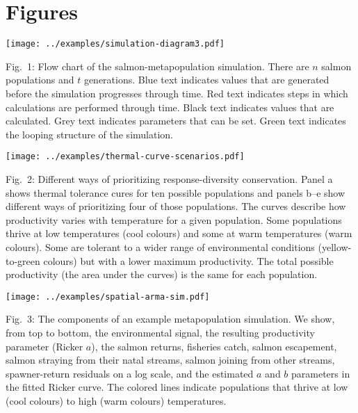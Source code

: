 



\clearpage

\section{Figures}

\texttt{[image: ../examples/simulation-diagram3.pdf]}

Fig.~1: Flow chart of the salmon-metapopulation simulation. There are $n$ salmon populations and $t$ generations. Blue text indicates values that are generated before the simulation progresses through time. Red text indicates steps in which calculations are performed through time. Black text indicates values that are calculated. Grey text indicates parameters that can be set. Green text indicates the looping structure of the simulation.

\clearpage

\texttt{[image: ../examples/thermal-curve-scenarios.pdf]}

Fig.~2: Different ways of prioritizing response-diversity conservation. Panel a shows thermal tolerance cures for ten possible populations and panels b--e show different ways of prioritizing four of those populations. The curves describe how productivity varies with temperature for a given population. Some populations thrive at low temperatures (cool colours) and some at warm temperatures (warm colours). Some are tolerant to a wider range of environmental conditions (yellow-to-green colours) but with a lower maximum productivity. The total possible productivity (the area under the curves) is the same for each population.

\clearpage

\texttt{[image: ../examples/spatial-arma-sim.pdf]}

Fig.~3: The components of an example metapopulation simulation. We show, from top to bottom, the environmental signal, the resulting productivity parameter (Ricker $a$), the salmon returns, fisheries catch, salmon escapement, salmon straying from their natal streams, salmon joining from other streams, spawner-return residuals on a log scale, and the estimated $a$ and $b$ parameters in the fitted Ricker curve. The colored lines indicate populations that thrive at low (cool colours) to high (warm colours) temperatures.

\clearpage

